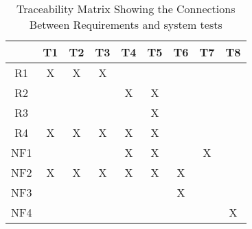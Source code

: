 \documentclass[12pt, titlepage]{article}
\begin{document}
\begin{table}[h!]
\centering
\begin{tabular}{|c|c|c|c|c|c|c|c|c|}
\hline
	& T1 & T2 & T3 & T4 & T5 & T6 & T7 &T8  \\
\hline
R1  & X&X & X& & & & &  \\ \hline
R2  & & & &X & X& & &   \\ \hline
R3  & & & & & X& & &   \\ \hline
R4  &X & X& X& X&X & & &  \\ \hline
NF1 & & & &X & X& & X&   \\ \hline
NF2   & X& X& X&X & X& X& &  \\ \hline
NF3   & & & & & & X& &  \\ \hline
NF4   & & & & & & & &X  \\ \hline
\hline
\end{tabular}
\caption{Traceability Matrix Showing the Connections Between Requirements and system tests}
\label{tab:reqtrace}
\end{table}
				



\end{document}
